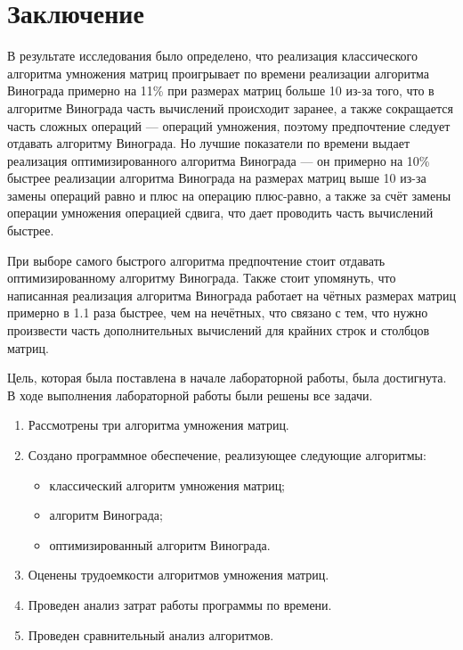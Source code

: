 \chapter*{Заключение}

В результате исследования было определено, что реализация классического алгоритма умножения матриц проигрывает по времени реализации алгоритма Винограда примерно на 11\% при размерах матриц больше 10 из-за того, что в алгоритме Винограда часть вычислений происходит заранее, а также сокращается часть сложных операций --- операций умножения, поэтому предпочтение следует отдавать алгоритму Винограда.
Но лучшие показатели по времени выдает реализация оптимизированного алгоритма Винограда --- он примерно на 10\% быстрее реализации алгоритма Винограда на размерах матриц выше 10 из-за замены операций равно и плюс на операцию плюс-равно, а также за счёт замены операции умножения операцией сдвига, что дает проводить часть вычислений быстрее.

При выборе самого быстрого алгоритма предпочтение стоит отдавать оптимизированному алгоритму Винограда.
Также стоит упомянуть, что написанная реализация алгоритма Винограда работает на чётных размерах матриц примерно в 1.1 раза быстрее, чем на нечётных, что связано с тем, что нужно произвести часть дополнительных вычислений для крайних строк и столбцов матриц.

Цель, которая была поставлена в начале лабораторной работы, была достигнута.
В ходе выполнения лабораторной работы были решены все задачи.
\begin{enumerate}[label={\arabic*)}]
	\item Рассмотрены три алгоритма умножения матриц.
	\item Создано программное обеспечение, реализующее следующие алгоритмы:
	\begin{itemize}[label=---]
		\item классический алгоритм умножения матриц;
		\item алгоритм Винограда;
		\item оптимизированный алгоритм Винограда.
	\end{itemize}
	\item Оценены трудоемкости алгоритмов умножения матриц.
	\item Проведен анализ затрат работы программы по времени.
	\item Проведен сравнительный анализ алгоритмов.
\end{enumerate}
